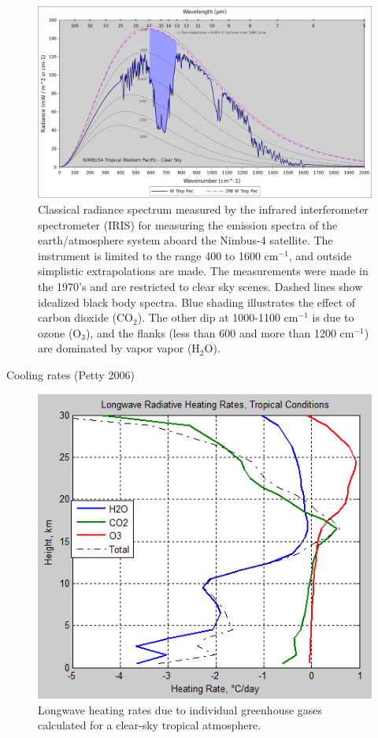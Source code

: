 \documentclass[12pt]{book}
\begin{document}
\begin{figure}
\begin{center}
\includegraphics[width=17 cm]{../external_figures/GW_Petty_IRIS_Tropical_Western_Pacific.png}
\end{center}
\caption{ Classical radiance spectrum measured by the infrared interferometer spectrometer (IRIS) for measuring the emission spectra of the earth/atmosphere system aboard the Nimbus-4 satellite. The instrument is limited to the range 400 to 1600 cm$^{-1}$, and outside simplistic extrapolations are made. The measurements were made in the 1970's and are restricted to clear sky scenes. Dashed lines show idealized black body spectra. Blue shading illustrates the effect of carbon dioxide (CO$_2$). The other dip at 1000-1100 cm$^{-1}$ is due to ozone (O$_3$), and the flanks (less than 600 and more than 1200 cm$^{-1}$) are dominated by vapor vapor (H$_2$O). } 
\label{fig:radiation_spectrum}
\end{figure}

Cooling rates (Petty 2006)

\begin{figure}
\begin{center}
\includegraphics[width=8 cm]{../external_figures/atmospheric-radiation-13c-heating-rates-tropical-each-h2o-co2-o3.png}
\end{center}
\caption{ Longwave heating rates due to individual greenhouse gases calculated for a clear-sky tropical atmosphere.  } 
\label{fig:radiative_cooling}
\end{figure}
\end{document}
